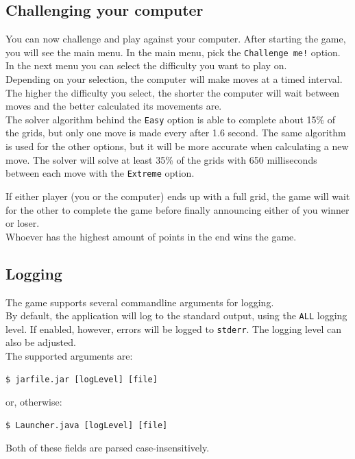 \documentclass[a4paper,11pt,report]{scrartcl}
\begin{document}
\subsection{Challenging your computer}

You can now challenge and play against your computer. After starting the game, you will see the main menu. In the main menu, pick the \texttt{Challenge me!} option. In the next menu you can select the difficulty you want to play on.\\

Depending on your selection, the computer will make moves at a timed interval. The higher the difficulty you select, the shorter the computer will wait between moves and the better calculated its movements are.\\

The solver algorithm behind the \texttt{Easy} option is able to complete about 15\% of the grids, but only one move is made every after 1.6 second. The same algorithm is used for the other options, but it will be more accurate when calculating a new move. The solver will solve at least 35\% of the grids with 650 milliseconds between each move with the \texttt{Extreme} option.

If either player (you or the computer) ends up with a full grid, the game will wait for the other to complete the game before finally announcing either of you winner or loser.\\

Whoever has the highest amount of points in the end wins the game.

\subsection{Logging}
The game supports several commandline arguments for logging.\\

By default, the application will log to the standard output, using the
\texttt{ALL} logging level. If enabled, however, errors will be logged to
\texttt{stderr}. The logging level can also be adjusted.\\

The supported arguments are:
\begin{verbatim}
$ jarfile.jar [logLevel] [file]
\end{verbatim}
or, otherwise:
\begin{verbatim}
$ Launcher.java [logLevel] [file]
\end{verbatim}
Both of these fields are parsed case-insensitively.\\
\end{document}
